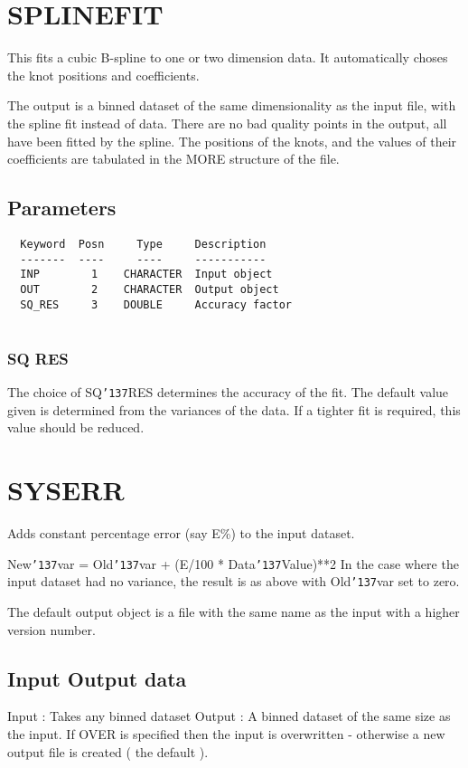 \documentclass{book}
\renewcommand{\_}{{\tt\char'137}}     %
\begin{document}
\section{SPLINEFIT}
This fits a cubic B-spline to one or two dimension data. It
automatically choses the knot positions and coefficients.
 
The output is a binned dataset of the same dimensionality as
the input file, with the spline fit instead of data. There are
no bad quality points in the output, all have been fitted by
the spline. The positions of the knots, and the values of their
coefficients are tabulated in the MORE structure of the file.
 
\subsection{Parameters}
\begin{verbatim}
  Keyword  Posn     Type     Description
  -------  ----     ----     -----------
  INP        1    CHARACTER  Input object
  OUT        2    CHARACTER  Output object
  SQ_RES     3    DOUBLE     Accuracy factor
 
\end{verbatim}\subsubsection{SQ RES}
The choice of SQ\_RES determines the accuracy of the fit. The
default value given is determined from the variances of the
data. If a tighter fit is required, this value should be
reduced.
 
\section{SYSERR}
Adds constant percentage error (say E\%) to the input dataset.
 
New\_var = Old\_var + (E/100 * Data\_Value)**2
In the case where the input dataset had no variance, the result
is as above with Old\_var set to zero.
 
The default output object is a file with the same name as the
input with a higher version number.
 
\subsection{Input Output data}
Input : Takes any binned dataset
Output : A binned dataset of the same size as
the input. If OVER is specified then
the input is overwritten - otherwise
a new output file is created ( the
default ).
\end{document}
